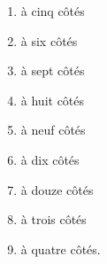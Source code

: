 \begin{description}
\begin{myenumerate}
\begin{multicols}{3}
\begin{enumerate}[a--]
    \item à cinq côtés
    \item à six côtés
    \item à sept côtés
    \item à huit côtés
    \item à neuf côtés
    \item à dix côtés
    \item à douze côtés
    \item à trois côtés
    \item à quatre côtés.
    \end{enumerate}
  \end{multicols}
  \end{myenumerate}
\end{description}